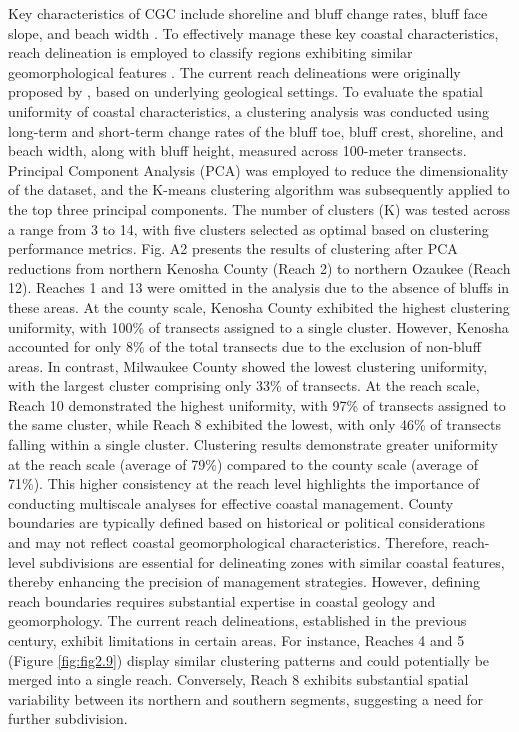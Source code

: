 Key characteristics of CGC include shoreline and bluff change rates, bluff face
slope, and beach width \citep{swenson_bluff_2006}. To effectively manage these
key coastal characteristics, reach delineation is employed to classify regions
exhibiting similar geomorphological features \citep{shipman2008geomorphic}. The
current reach delineations were originally proposed by
\citet{mickelson1977shoreline}, based on underlying geological settings. To
evaluate the spatial uniformity of coastal characteristics, a clustering
analysis was conducted using long-term and short-term change rates of the bluff
toe, bluff crest, shoreline, and beach width, along with bluff height, measured
across 100-meter transects. Principal Component Analysis (PCA) was employed to
reduce the dimensionality of the dataset, and the K-means clustering algorithm
was subsequently applied to the top three principal components. The number of
clusters (K) was tested across a range from 3 to 14, with five clusters selected
as optimal based on clustering performance metrics. Fig. A2 presents the results
of clustering after PCA reductions from northern Kenosha County (Reach 2) to
northern Ozaukee (Reach 12). Reaches 1 and 13 were omitted in the analysis due
to the absence of bluffs in these areas. At the county scale, Kenosha County
exhibited the highest clustering uniformity, with 100\% of transects assigned to
a single cluster.  However, Kenosha accounted for only 8\% of the total
transects due to the exclusion of non-bluff areas. In contrast, Milwaukee County
showed the lowest clustering uniformity, with the largest cluster comprising
only 33\% of transects. At the reach scale, Reach 10 demonstrated the highest
uniformity, with 97\% of transects assigned to the same cluster, while Reach 8
exhibited the lowest, with only 46\% of transects falling within a single
cluster. Clustering results demonstrate greater uniformity at the reach scale
(average of 79\%) compared to the county scale (average of 71\%). This higher
consistency at the reach level highlights the importance of conducting
multiscale analyses for effective coastal management. County boundaries are
typically defined based on historical or political considerations and may not
reflect coastal geomorphological characteristics. Therefore, reach-level
subdivisions are essential for delineating zones with similar coastal features,
thereby enhancing the precision of management strategies. However, defining
reach boundaries requires substantial expertise in coastal geology and
geomorphology. The current reach delineations, established in the previous
century, exhibit limitations in certain areas. For instance, Reaches 4 and 5
(Figure \ref{fig:fig2.9}) display similar clustering patterns and could
potentially be merged into a single reach.  Conversely, Reach 8 exhibits
substantial spatial variability between its northern and southern segments,
suggesting a need for further subdivision.

